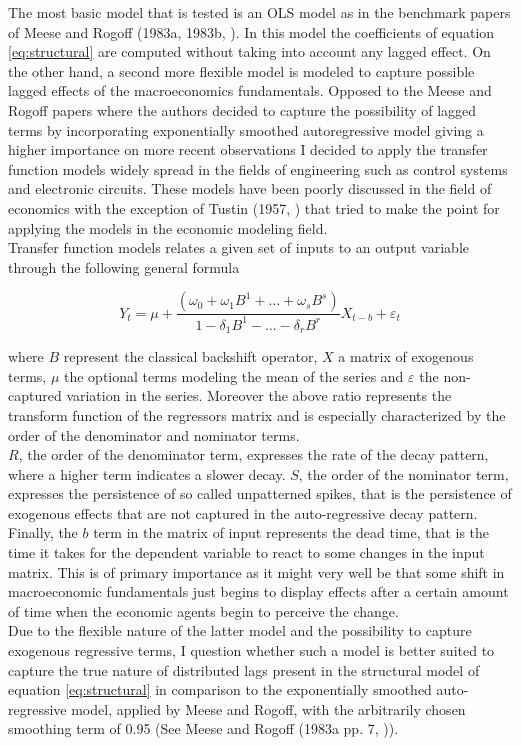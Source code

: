 The most basic model that is tested is an OLS model as in the
benchmark papers of Meese and Rogoff (1983a, 1983b,
\cite{MeeseRogoffa, MeeseRogoffb}). In this model the coefficients of
equation \ref{eq:structural} are computed without taking into account
any lagged effect.  On the other hand, a second more flexible model is
modeled to capture possible lagged effects of the macroeconomics
fundamentals. Opposed to the Meese and Rogoff papers where the authors
decided to capture the possibility of lagged terms by incorporating
exponentially smoothed autoregressive model giving a higher importance
on more recent observations I decided to apply the transfer function
models widely spread in the fields of engineering such as control
systems and electronic circuits. These models have been poorly
discussed in the field of economics with the exception of Tustin
(1957, \cite{Tustin}) that tried to
make the point for applying the models in the economic modeling field.\\
Transfer function models relates a given set of inputs to an output
variable through the following general formula

\begin{equation} \label{eq:transfer}
  Y_{t} = \mu + \frac{(\omega_{0}+\omega_{1}B^{1}+\dots+\omega_{s}B^{s})}{1-\delta_{1}B^{1}-\dots-\delta_{r}B^{r}}X_{t-b} + \varepsilon_{t}
\end{equation}

where $B$ represent the classical backshift operator, $X$ a matrix of
exogenous terms, $\mu$ the optional terms modeling the mean of the
series and $\varepsilon$ the non-captured variation in the
series. Moreover the above ratio represents the transform function of
the regressors matrix and is especially characterized by the order of
the denominator and
nominator terms. \\
$R$, the order of the denominator term, expresses the rate of the
decay pattern, where a higher term indicates a slower decay.  $S$, the
order of the nominator term, expresses the persistence of so called
unpatterned spikes, that is the persistence of exogenous effects that
are not captured in the auto-regressive decay pattern. Finally, the
$b$ term in the matrix of input represents the dead time, that is the
time it takes for the dependent variable to react to some changes in
the input matrix. This is of primary importance as it might very well
be that some shift in macroeconomic fundamentals just begins to
display effects after a certain amount of time when
the economic agents begin to perceive the change.\\
Due to the flexible nature of the latter model and the possibility to
capture exogenous regressive terms, I question whether such a model is
better suited to capture the true nature of distributed lags present
in the structural model of equation \ref{eq:structural} in comparison
to the exponentially smoothed auto-regressive model, applied by Meese
and Rogoff, with the arbitrarily chosen smoothing term of 0.95 (See
Meese and Rogoff (1983a pp. 7, \cite{MeeseRogoffa})).


